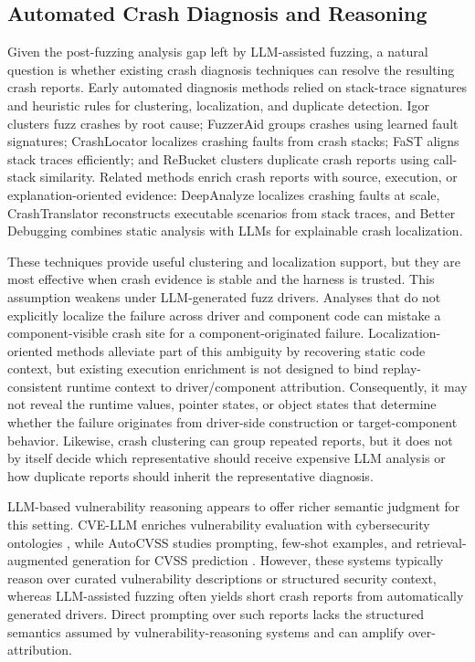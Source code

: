 \documentclass[pdflatex,sn-basic]{sn-jnl}%
\theoremstyle{thmstyleone}%
\theoremstyle{thmstyletwo}%
\theoremstyle{thmstylethree}%
\begin{document}
\subsection{Automated Crash Diagnosis and Reasoning}

Given the post-fuzzing analysis gap left by LLM-assisted fuzzing, a natural question is whether existing crash diagnosis techniques can resolve the resulting crash reports. Early automated diagnosis methods relied on stack-trace signatures and heuristic rules for clustering, localization, and duplicate detection. Igor \citep{ref21} clusters fuzz crashes by root cause; FuzzerAid \citep{ref22} groups crashes using learned fault signatures; CrashLocator \citep{ref23} localizes crashing faults from crash stacks; FaST \citep{ref24} aligns stack traces efficiently; and ReBucket \citep{ref25} clusters duplicate crash reports using call-stack similarity. Related methods enrich crash reports with source, execution, or explanation-oriented evidence: DeepAnalyze \citep{ref14} localizes crashing faults at scale, CrashTranslator \citep{ref15} reconstructs executable scenarios from stack traces, and Better Debugging \citep{ref20} combines static analysis with LLMs for explainable crash localization.

These techniques provide useful clustering and localization support, but they are most effective when crash evidence is stable and the harness is trusted. This assumption weakens under LLM-generated fuzz drivers. Analyses that do not explicitly localize the failure across driver and component code can mistake a component-visible crash site for a component-originated failure. Localization-oriented methods alleviate part of this ambiguity by recovering static code context, but existing execution enrichment is not designed to bind replay-consistent runtime context to driver/component attribution. Consequently, it may not reveal the runtime values, pointer states, or object states that determine whether the failure originates from driver-side construction or target-component behavior. Likewise, crash clustering can group repeated reports, but it does not by itself decide which representative should receive expensive LLM analysis or how duplicate reports should inherit the representative diagnosis.

LLM-based vulnerability reasoning appears to offer richer semantic judgment for this setting. CVE-LLM enriches vulnerability evaluation with cybersecurity ontologies \citep{ref28}, while AutoCVSS studies prompting, few-shot examples, and retrieval-augmented generation for CVSS prediction \citep{ref29}. However, these systems typically reason over curated vulnerability descriptions or structured security context, whereas LLM-assisted fuzzing often yields short crash reports from automatically generated drivers. Direct prompting over such reports lacks the structured semantics assumed by vulnerability-reasoning systems and can amplify over-attribution.
\end{document}
